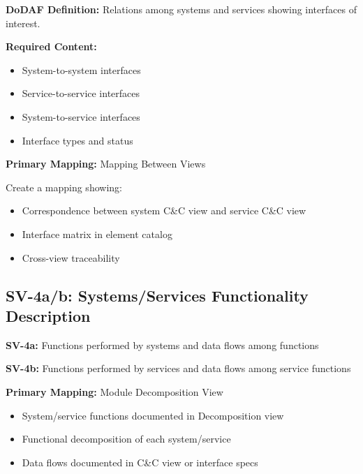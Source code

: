 \documentclass[11pt]{article}
\begin{document}
\begin{dodafbox}
\textbf{DoDAF Definition:} Relations among systems and services showing interfaces of interest.

\textbf{Required Content:}
\begin{itemize}[nosep]
    \item System-to-system interfaces
    \item Service-to-service interfaces
    \item System-to-service interfaces
    \item Interface types and status
\end{itemize}
\end{dodafbox}

\begin{vbbox}
\textbf{Primary Mapping:} Mapping Between Views

Create a mapping showing:
\begin{itemize}
    \item Correspondence between system C\&C view and service C\&C view
    \item Interface matrix in element catalog
    \item Cross-view traceability
\end{itemize}
\end{vbbox}

\subsection{SV-4a/b: Systems/Services Functionality Description}

\begin{dodafbox}
\textbf{SV-4a:} Functions performed by systems and data flows among functions

\textbf{SV-4b:} Functions performed by services and data flows among service functions
\end{dodafbox}

\begin{vbbox}
\textbf{Primary Mapping:} Module Decomposition View

\begin{itemize}
    \item System/service functions documented in Decomposition view
    \item Functional decomposition of each system/service
    \item Data flows documented in C\&C view or interface specs
\end{itemize}
\end{vbbox}
\end{document}
